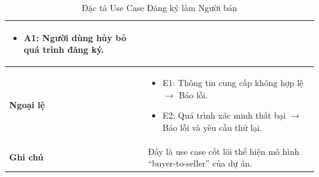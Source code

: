 \begin{table}[H]
\begin{tabularx}{\textwidth}{|l|X|}
\begin{itemize}
    \item A1: Người dùng hủy bỏ quá trình đăng ký.
\end{itemize} \\ \hline
\textbf{Ngoại lệ} & 
\begin{itemize}
    \item E1: Thông tin cung cấp không hợp lệ $\rightarrow$ Báo lỗi.
    \item E2: Quá trình xác minh thất bại $\rightarrow$ Báo lỗi và yêu cầu thử lại.
\end{itemize} \\ \hline
\textbf{Ghi chú} & Đây là use case cốt lõi thể hiện mô hình ``buyer-to-seller'' của dự án. \\ \hline
\end{tabularx}
\caption{Đặc tả Use Case Đăng ký làm Người bán}
\end{table}
